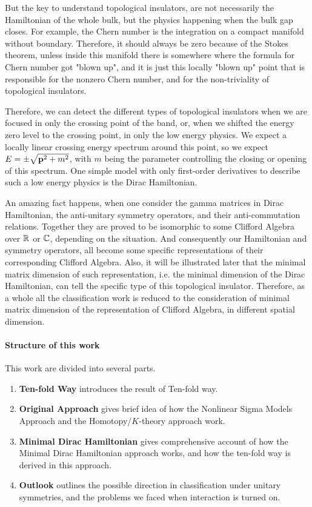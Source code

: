 \documentclass{article}
\begin{document}
But the key to understand topological insulators, are not necessarily the
Hamiltonian of the whole bulk, but the physics happening when the bulk gap
closes. For example, the Chern number is the integration on a compact manifold
without boundary. Therefore, it should always be zero because of the Stokes theorem,
unless inside this manifold there is somewhere where the formula for Chern
number got "blown up", and it is just this locally "blown up" point that is
responsible for the nonzero Chern number, and for the non-triviality of
topological insulators.

Therefore, we can detect the different types of topological insulators when we
are focused in only the crossing point of the band, or, when we shifted the
energy zero level to the crossing point, in only the low energy physics. We
expect a locally linear crossing energy spectrum around this point, so we expect
$E=\pm\sqrt{\vb{p}^2+m^2}$, with $m$ being the parameter controlling the closing or
opening of this spectrum. One simple model with only first-order derivatives to
describe such a low energy physics is the Dirac Hamiltonian.

An amazing fact happens, when one consider the gamma matrices in Dirac
Hamiltonian, the anti-unitary symmetry operators, and their anti-commutation
relations. Together they are proved to be isomorphic to some Clifford Algebra over
$\mathbb{R}$ or $\mathbb{C}$, depending on the situation. And consequently our Hamiltonian and
symmetry operators, all become some specific representations of their
corresponding Clifford Algebra. Also, it will be illustrated later that the
minimal matrix dimension of such representation, i.e. the minimal dimension of
the Dirac Hamiltonian, can tell the specific type of this topological
insulator. Therefore, as a whole all the classification work is reduced to the
consideration of minimal matrix dimension of the representation of Clifford
Algebra, in different spatial dimension.

\paragraph{Structure of this work} This work are divided into several parts.
\begin{enumerate}
    \item \textbf{Ten-fold Way} introduces the result of Ten-fold way. 
    \item \textbf{Original Approach} gives brief idea of how the Nonlinear Sigma
        Models Approach and the Homotopy/$K$-theory approach work.
    \item \textbf{Minimal Dirac Hamiltonian} gives comprehensive account of how
        the Minimal Dirac Hamiltonian approach works, and how the ten-fold way
        is derived in this approach.
    \item \textbf{Outlook} outlines the possible direction in classification
        under unitary symmetries, and the problems we faced when interaction is
        turned on.
\end{enumerate}
\end{document}
